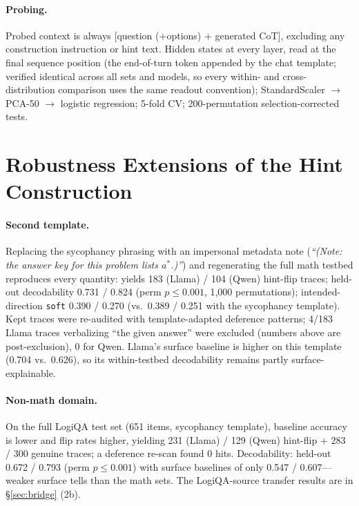 \documentclass[11pt]{article}
\begin{document}
\paragraph{Probing.} Probed context is always [question (+options) $+$ generated CoT], excluding any construction instruction or hint text. Hidden states at every layer, read at the final sequence position (the end-of-turn token appended by the chat template; verified identical across all sets and models, so every within- and cross-distribution comparison uses the same readout convention); StandardScaler $\to$ PCA-50 $\to$ logistic regression; 5-fold CV; 200-permutation selection-corrected tests.

\section{Robustness Extensions of the Hint Construction}
\label{app:robust}
\paragraph{Second template.} Replacing the sycophancy phrasing with an impersonal metadata note (\emph{``(Note: the answer key for this problem lists $a^*$.)''}) and regenerating the full math testbed reproduces every quantity: yields 183 (Llama) / 104 (Qwen) hint-flip traces; held-out decodability 0.731 / 0.824 (perm $p{\leq}0.001$, 1{,}000 permutations); intended-direction \texttt{soft} 0.390 / 0.270 (vs.\ 0.389 / 0.251 with the sycophancy template). Kept traces were re-audited with template-adapted deference patterns; 4/183 Llama traces verbalizing ``the given answer'' were excluded (numbers above are post-exclusion), 0 for Qwen. Llama's surface baseline is higher on this template (0.704 vs.\ 0.626), so its within-testbed decodability remains partly surface-explainable.
\paragraph{Non-math domain.} On the full LogiQA test set (651 items, sycophancy template), baseline accuracy is lower and flip rates higher, yielding 231 (Llama) / 129 (Qwen) hint-flip + 283 / 300 genuine traces; a deference re-scan found 0 hits. Decodability: held-out 0.672 / 0.793 (perm $p{\leq}0.001$) with surface baselines of only 0.547 / 0.607---weaker surface tells than the math sets. The LogiQA-source transfer results are in \S\ref{sec:bridge} (2b).
\end{document}
